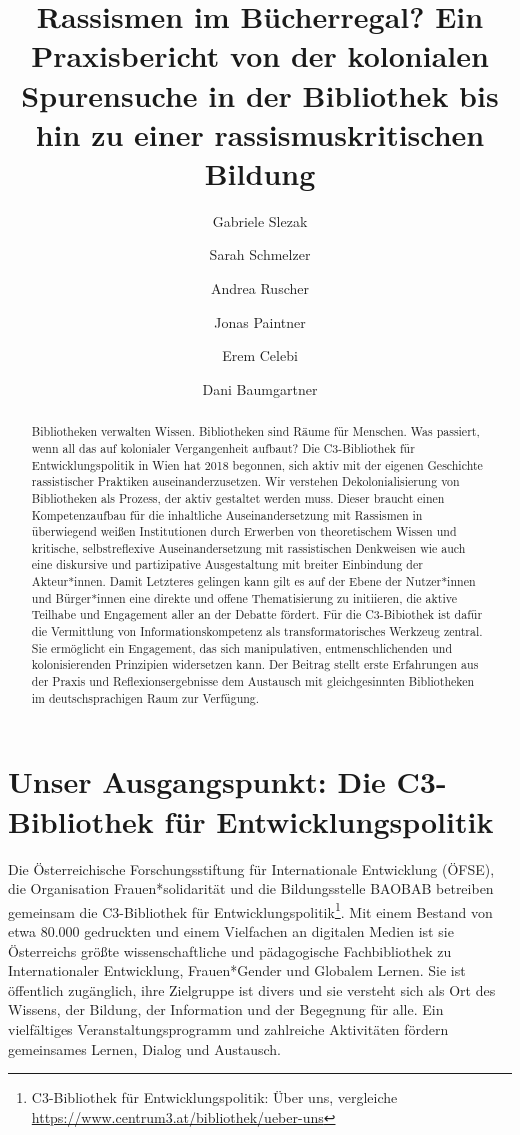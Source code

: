 \documentclass[a4paper,
fontsize=11pt,
oneside,
numbers=noperiodatend,
parskip=half-,
bibliography=totoc,
final
]{scrartcl}
\title{\LARGE{Rassismen im Bücherregal? Ein Praxisbericht von der kolonialen Spurensuche in der Bibliothek bis hin zu einer rassismuskritischen Bildung}}%
\author{Gabriele Slezak \and Sarah Schmelzer \and Andrea Ruscher \and Jonas Paintner \and Erem Celebi \and Dani Baumgartner} %
\date{}
\begin{document}
\maketitle
\thispagestyle{fancyplain} 

\begin{abstract}
\noindent
Bibliotheken verwalten Wissen. Bibliotheken sind Räume für
Menschen. Was passiert, wenn all das auf kolonialer Vergangenheit
aufbaut? Die C3-Bibliothek für Entwicklungspolitik in Wien hat 2018
begonnen, sich aktiv mit der eigenen Geschichte rassistischer Praktiken
auseinanderzusetzen. Wir verstehen Dekolonialisierung von Bibliotheken
als Prozess, der aktiv gestaltet werden muss. Dieser braucht einen
Kompetenzaufbau für die inhaltliche Auseinandersetzung mit Rassismen in
überwiegend weißen Institutionen durch Erwerben von theoretischem Wissen
und kritische, selbstreflexive Auseinandersetzung mit rassistischen
Denkweisen wie auch eine diskursive und partizipative Ausgestaltung mit
breiter Einbindung der Akteur*innen. Damit Letzteres gelingen kann gilt
es auf der Ebene der Nutzer*innen und Bürger*innen eine direkte und
offene Thematisierung zu initiieren, die aktive Teilhabe und Engagement
aller an der Debatte fördert. Für die C3-Bibiothek ist dafür die
Vermittlung von Informationskompetenz als transformatorisches Werkzeug
zentral. Sie ermöglicht ein Engagement, das sich manipulativen,
entmenschlichenden und kolonisierenden Prinzipien widersetzen kann. Der
Beitrag stellt erste Erfahrungen aus der Praxis und Reflexionsergebnisse
dem Austausch mit gleichgesinnten Bibliotheken im deutschsprachigen Raum
zur Verfügung.
\end{abstract}

\hypertarget{unser-ausgangspunkt-die-c3-bibliothek-fuxfcr-entwicklungspolitik}{%
\section{Unser Ausgangspunkt: Die C3-Bibliothek für
Entwicklungspolitik}\label{unser-ausgangspunkt-die-c3-bibliothek-fuxfcr-entwicklungspolitik}}

Die Österreichische Forschungsstiftung für Internationale Entwicklung
(ÖFSE), die Organisation Frauen*solidarität und die Bildungsstelle
BAOBAB betreiben gemeinsam die C3-Bibliothek für
Entwicklungspolitik\footnote{C3-Bibliothek für Entwicklungspolitik: Über
  uns, vergleiche \url{https://www.centrum3.at/bibliothek/ueber-uns}}.
Mit einem Bestand von etwa 80.000 gedruckten und einem Vielfachen an
digitalen Medien ist sie Österreichs größte wissenschaftliche und
pädagogische Fachbibliothek zu Internationaler Entwicklung,
Frauen*Gender und Globalem Lernen. Sie ist öffentlich zugänglich, ihre
Zielgruppe ist divers und sie versteht sich als Ort des Wissens, der
Bildung, der Information und der Begegnung für alle. Ein vielfältiges
Veranstaltungsprogramm und zahlreiche Aktivitäten fördern gemeinsames
Lernen, Dialog und Austausch.
\end{document}
